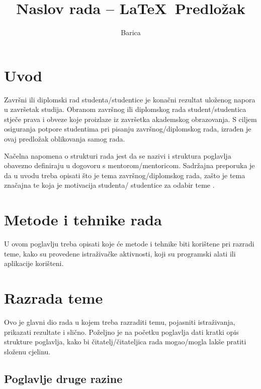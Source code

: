 \documentclass[]{foi}
\title{Naslov rada -- \LaTeX\ Predložak}
\author{Barica}
\begin{document}
\maketitle

\tableofcontents

\makeatletter {} \makeatother
\pagestyle{plain}



\chapter{Uvod}

Završni ili diplomski rad studenta/studentice je konačni rezultat uloženog napora u završetak studija. Obranom završnog ili diplomskog rada student/studentica stječe prava i obveze koje proizlaze iz završetka akademskog obrazovanja. S ciljem osiguranja potpore studentima pri pisanju završnog/diplomskog rada, izrađen je ovaj predložak oblikovanja samog rada.

Načelna napomena o strukturi rada jest da se nazivi i struktura poglavlja obavezno definiraju u dogovoru s mentorom/mentoricom. Sadržajna preporuka je da u uvodu treba opisati što je tema završnog/diplomskog rada, zašto je tema značajna te koja je motivacija studenta/ studentice za odabir teme \cite{oraictolic2011AkademskoPismoStrategije}.



\chapter{Metode i tehnike rada}

U ovom poglavlju treba opisati koje će metode i tehnike biti korištene pri razradi teme, kako su provedene istraživačke aktivnosti, koji su programski alati ili aplikacije korišteni.

\lipsum[1-2]



\chapter{Razrada teme}

Ovo je glavni dio rada u kojem treba razraditi temu, pojasniti istraživanja, prikazati rezultate i slično. Poželjno je na početku poglavlja dati kratki opis strukture poglavlja, kako bi čitatelj/čitateljica rada mogao/mogla lakše pratiti složenu cjelinu.



\section{Poglavlje druge razine }
\end{document}
